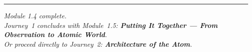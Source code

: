 \documentclass[12pt, a4paper]{book}
\theoremstyle{definition}
\begin{document}
\vspace{2em}
\noindent\textcolor{JourneyColor!40}{\rule{\textwidth}{0.6pt}}
\begin{center}
\textit{\sffamily\small
Module 1.4 complete.\\
Journey~1 concludes with Module~1.5:
\textbf{Putting It Together --- From Observation to Atomic World}.\\
Or proceed directly to Journey~2:
\textbf{Architecture of the Atom}.}
\end{center}
\end{document}
